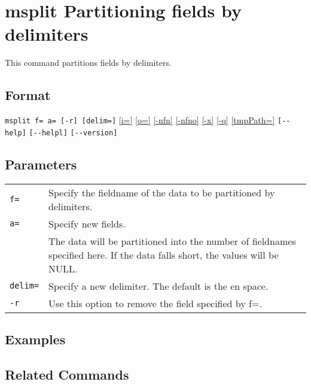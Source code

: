 
%
\section{msplit Partitioning fields by delimiters\label{sect:msplit}}
This command partitions fields by delimiters.

\subsection*{Format}
\verb|msplit f= a= [-r] [delim=]|
\hyperref[sect:option_i]{[i=]}
\hyperref[sect:option_o]{[o=]}
\hyperref[sect:option_nfn]{[-nfn]} 
\hyperref[sect:option_nfno]{[-nfno]}  
\hyperref[sect:option_x]{[-x]}
\hyperref[sect:option_q]{[-q]}
\hyperref[sect:option_option_tmppath]{[tmpPath=]}
\verb|[--help]|
\verb|[--helpl]|
\verb|[--version]|\\

\subsection*{Parameters}
\begin{table}[htbp]
{\small
\begin{tabular}{ll}
\verb|f=|    & Specify the fieldname of the data to be partitioned by delimiters.\\
\verb|a=|    & Specify new fields.\\
             & The data will be partitioned into the number of fieldnames specified here. If the data falls short, the values will be NULL.\\
\verb|delim=| & Specify a new delimiter. The default is the en space.\\
\verb|-r|    & Use this option to remove the field specified by f=.\\
\end{tabular} 
}
\end{table} 

\subsection*{Examples}

\subsection*{Related Commands}

%

